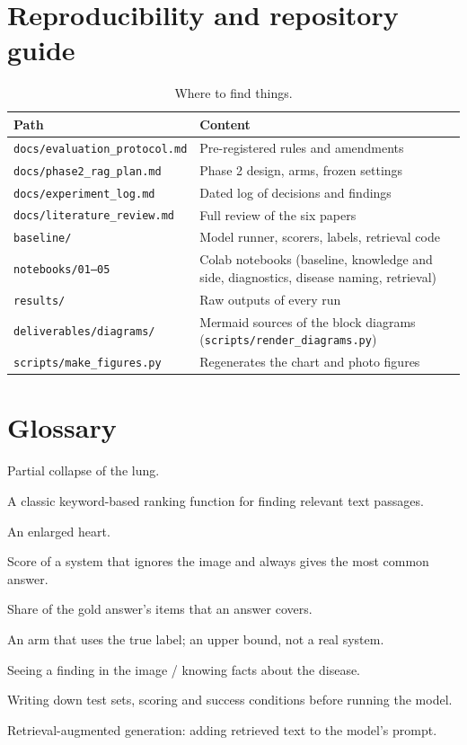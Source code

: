 \documentclass[11pt,a4paper]{article}
\begin{document}
\appendix
\section{Reproducibility and repository guide}\label{sec:repro}
\begin{table}[H]
\centering
\small
\begin{tabularx}{\linewidth}{@{}lX@{}}
\toprule
Path & Content \\
\midrule
\texttt{docs/evaluation\_protocol.md} & Pre-registered rules and amendments \\
\texttt{docs/phase2\_rag\_plan.md} & Phase 2 design, arms, frozen settings \\
\texttt{docs/experiment\_log.md} & Dated log of decisions and findings \\
\texttt{docs/literature\_review.md} & Full review of the six papers \\
\texttt{baseline/} & Model runner, scorers, labels, retrieval code \\
\texttt{notebooks/01--05} & Colab notebooks (baseline, knowledge and side, diagnostics, disease naming, retrieval) \\
\texttt{results/} & Raw outputs of every run \\
\texttt{deliverables/diagrams/} & Mermaid sources of the block diagrams (\texttt{scripts/render\_diagrams.py}) \\
\texttt{scripts/make\_figures.py} & Regenerates the chart and photo figures \\
\bottomrule
\end{tabularx}
\caption{Where to find things.}
\end{table}

\section{Glossary}
\begin{description}[style=nextline]
\item[Atelectasis] Partial collapse of the lung.
\item[BM25] A classic keyword-based ranking function for finding relevant text passages.
\item[Cardiomegaly] An enlarged heart.
\item[Constant-answer floor] Score of a system that ignores the image and always gives the most common answer.
\item[Item recall] Share of the gold answer's items that an answer covers.
\item[Oracle] An arm that uses the true label; an upper bound, not a real system.
\item[Perception / knowledge] Seeing a finding in the image / knowing facts about the disease.
\item[Pre-registration] Writing down test sets, scoring and success conditions before running the model.
\item[RAG] Retrieval-augmented generation: adding retrieved text to the model's prompt.
\end{description}
\end{document}
